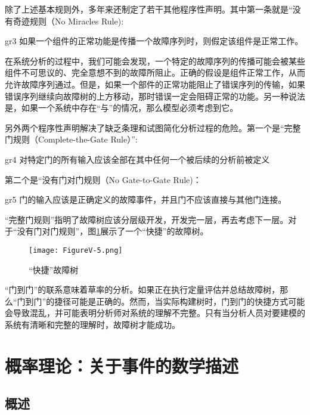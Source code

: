 \documentclass[cn,11pt,chinese]{elegantbook}
\begin{document}
 除了上述基本规则外，多年来还制定了若干其他程序性声明。其中第一条就是“没有奇迹规则（No Miracles Rule):
 
 \begin{postulate}{}{gr3}
 如果一个组件的正常功能是传播一个故障序列时，则假定该组件是正常工作。
 \end{postulate}

 在系统分析的过程中，我们可能会发现，一个特定的故障序列的传播可能会被某些组件不可思议的、完全意想不到的故障所阻止。正确的假设是组件正常工作，从而允许故障序列通过。但是，如果一个部件的正常功能阻止了错误序列的传输，如果错误序列继续向故障树的上方移动，那时错误一定会阻碍正常的功能。另一种说法是，如果一个系统中存在“与”的情况，那么模型必须考虑到它。
 
 另外两个程序性声明解决了缺乏条理和试图简化分析过程的危险。第一个是“完整门规则（Complete-the-Gate Rule）”:
 
\begin{postulate}{}{gr4}
对特定门的所有输入应该全部在其中任何一个被后续的分析前被定义
\end{postulate}

 第二个是“没有门对门规则（No Gate-to-Gate Rule)：

 \begin{postulate}{}{gr5}
 门的输入应该是正确定义的故障事件，并且门不应该直接与其他门连接。
 \end{postulate}

 “完整门规则”指明了故障树应该分层级开发，开发完一层，再去考虑下一层。对于“没有门对门规则”，图\ref{fig:fig5_5}展示了一个“快捷”的故障树。


\begin{figure}[H]
	\centering
	\texttt{[image: FigureV-5.png]}
	\caption{“快捷”故障树}\label{fig:fig5_5}
\end{figure}
 
 “门到门”的联系意味着草率的分析。如果正在执行定量评估并总结故障树，那么“门到门”的捷径可能是正确的。然而，当实际构建树时，门到门的快捷方式可能会导致混乱，并可能表明分析师对系统的理解不完整。只有当分析人员对要建模的系统有清晰和完整的理解时，故障树才能成功。
 
 \chapter{概率理论：关于事件的数学描述}
 \section{概述}
 
\end{document}
